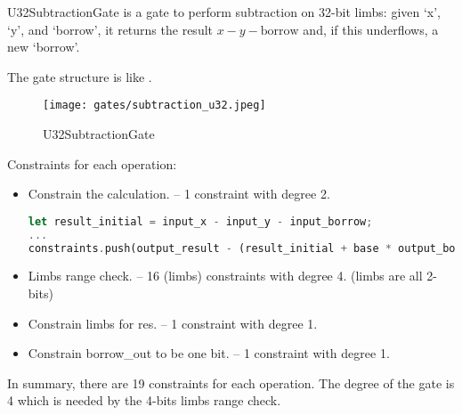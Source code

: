 
\hspace*{\fill}

\indent U32SubtractionGate is a gate to perform subtraction on 32-bit limbs: given `x', `y', and `borrow', it returns 
the result $x - y - \text{borrow}$ and, if this underflows, a new `borrow'.

The gate structure is like .

\begin{figure}[!ht]
    \centering
    \texttt{[image: gates/subtraction\_u32.jpeg]}
    \caption{U32SubtractionGate}
    \label{fig:subtraction-u32}
\end{figure}

Constraints for each operation:
\begin{itemize}
    \item Constrain the calculation. -- 1 constraint with degree 2.
    \begin{lstlisting}[language=rust]
let result_initial = input_x - input_y - input_borrow;
...
constraints.push(output_result - (result_initial + base * output_borrow));
    \end{lstlisting}
    \item Limbs range check. -- 16 (limbs) constraints with degree 4. (limbs are all 2-bits)
    \item Constrain limbs for res. -- 1 constraint with degree 1.
    \item Constrain borrow\_out to be one bit. -- 1 constraint with degree 1.
\end{itemize}

In summary, there are 19 constraints for each operation. The degree of the gate is 4 which is needed by the 4-bits limbs range check.
